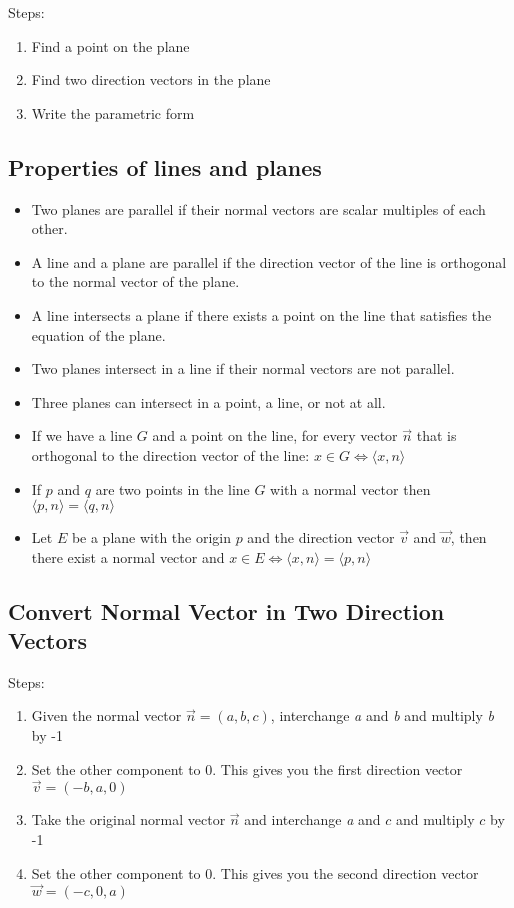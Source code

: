 Steps:

\begin{enumerate}
	\item Find a point on the plane
	\item Find two direction vectors in the plane
	\item Write the parametric form
\end{enumerate}

\subsection{Properties of lines and planes}

\begin{itemize}
	\item Two planes are parallel if their normal vectors are scalar multiples of each other.
	\item A line and a plane are parallel if the direction vector of the line is orthogonal to the normal vector of the plane.
	\item A line intersects a plane if there exists a point on the line that satisfies the equation of the plane.
	\item Two planes intersect in a line if their normal vectors are not parallel.
	\item Three planes can intersect in a point, a line, or not at all.
	\item If we have a line \(G\) and a point on the line, for every vector \(\vec{n}\) that is orthogonal to the
	      direction vector of the line: \(x \in G \iff \langle x, n \rangle\)
	\item If \(p\) and \(q\) are two points in the line \(G\) with a normal vector then \(\langle p, n\rangle = \langle q, n\rangle\)
	\item Let \(E\) be a plane with the origin \(p\) and the direction vector \(\vec{v}\) and \(\vec{w}\), then there exist a normal vector and
	      \(x \in E \iff \langle x, n\rangle = \langle p, n \rangle\)
\end{itemize}

\subsection{Convert Normal Vector in Two Direction Vectors}

Steps:

\begin{enumerate}
	\item Given the normal vector \(\vec{n} = (a, b, c)\), interchange \emph{a} and \emph{b} and multiply \emph{b} by -1
	\item Set the other component to 0. This gives you the first direction vector \(\vec{v} = (-b, a, 0)\)
	\item Take the original normal vector \(\vec{n}\) and interchange \emph{a} and \(c\) and multiply \(c\) by -1
	\item Set the other component to 0. This gives you the second direction vector \(\vec{w} = (-c, 0, a)\)
\end{enumerate}

